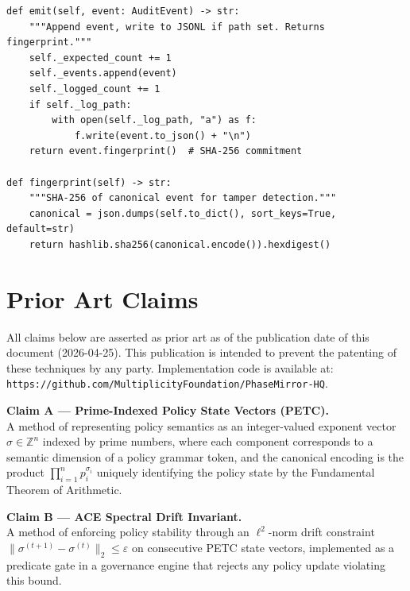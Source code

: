 \documentclass[12pt,letterpaper]{article}
\theoremstyle{definition}
\theoremstyle{remark}
\begin{document}
\begin{noteboxtc}
\begin{lstlisting}[style=pythonstyle, caption={AuditLog.emit() and AuditEvent.fingerprint()}, label={lst:auditlog}]
def emit(self, event: AuditEvent) -> str:
    """Append event, write to JSONL if path set. Returns fingerprint."""
    self._expected_count += 1
    self._events.append(event)
    self._logged_count += 1
    if self._log_path:
        with open(self._log_path, "a") as f:
            f.write(event.to_json() + "\n")
    return event.fingerprint()  # SHA-256 commitment

def fingerprint(self) -> str:
    """SHA-256 of canonical event for tamper detection."""
    canonical = json.dumps(self.to_dict(), sort_keys=True, default=str)
    return hashlib.sha256(canonical.encode()).hexdigest()
\end{lstlisting}
\end{noteboxtc}

\newpage

\section{Prior Art Claims}

\begin{priorartbox}
All claims below are asserted as prior art as of the publication date of this document
(2026-04-25). This publication is intended to prevent the patenting of these techniques
by any party. Implementation code is available at:
\texttt{https://github.com/MultiplicityFoundation/PhaseMirror-HQ}.
\end{priorartbox}

\begin{claimbox}
\textbf{Claim A — Prime-Indexed Policy State Vectors (PETC).}\\
A method of representing policy semantics as an integer-valued exponent vector
\(\sigma \in \mathbb{Z}^n\) indexed by prime numbers, where each component corresponds
to a semantic dimension of a policy grammar token, and the canonical encoding is the
product \(\prod_{i=1}^n p_i^{\sigma_i}\) uniquely identifying the policy state by
the Fundamental Theorem of Arithmetic.
\end{claimbox}

\begin{claimbox}
\textbf{Claim B — ACE Spectral Drift Invariant.}\\
A method of enforcing policy stability through an \(\ell^2\)-norm drift constraint
\(\|\sigma^{(t+1)} - \sigma^{(t)}\|_2 \leq \varepsilon\) on consecutive PETC state
vectors, implemented as a predicate gate in a governance engine that rejects any policy
update violating this bound.
\end{claimbox}
\end{document}
